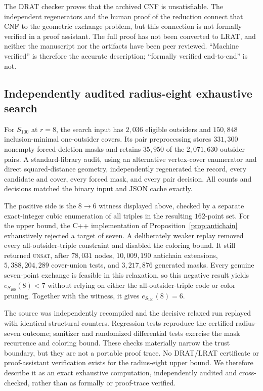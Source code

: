 \documentclass[11pt]{article}
\theoremstyle{definition}
\theoremstyle{remark}
\begin{document}
The DRAT checker proves that the archived CNF is unsatisfiable.  The independent
regenerators and the human proof of the reduction connect that CNF to the
geometric exchange problem, but this connection is not formally verified in a
proof assistant.  The full proof has not been converted to LRAT, and neither
the manuscript nor the artifacts have been peer reviewed.  ``Machine
verified'' is therefore the accurate description; ``formally verified
end-to-end'' is not.

\subsection{Independently audited radius-eight exhaustive search}

For $S_{100}$ at $r=8$, the search input has $2{,}036$ eligible outsiders and
$150{,}848$ inclusion-minimal one-outsider covers.  Its pair preprocessing
stores $331{,}300$ nonempty forced-deletion masks and retains $35{,}950$ of the
$2{,}071{,}630$ outsider pairs.  A standard-library audit, using an alternative
vertex-cover enumerator and direct squared-distance geometry, independently
regenerated the record, every candidate and cover, every forced mask, and
every pair decision.  All counts and decisions matched the binary input and
JSON cache exactly.

The positive side is the $8\to6$ witness displayed above, checked by a
separate exact-integer cubic enumeration of all triples in the resulting
$162$-point set.  For the upper bound, the C++ implementation of
Proposition~\ref{prop:antichain} exhaustively rejected a target of seven.  A
deliberately weaker replay removed every all-outsider-triple constraint and
disabled the coloring bound.  It still returned \textsc{unsat}, after
$78{,}031$ nodes, $10{,}009{,}190$ antichain extensions,
$5{,}388{,}204{,}289$ cover-union tests, and $3{,}217{,}876$ generated masks.
Every genuine seven-point exchange is feasible in this relaxation, so this
negative result yields $e_{S_{100}}(8)<7$ without relying on either the
all-outsider-triple code or color pruning.  Together with the witness, it gives
$e_{S_{100}}(8)=6$.

The source was independently recompiled and the decisive relaxed run replayed
with identical structural counters.  Regression tests reproduce the certified
radius-seven outcome; sanitizer and randomized differential tests exercise the
mask recurrence and coloring bound.  These checks materially narrow the trust
boundary, but they are not a portable proof trace.  No DRAT/LRAT certificate or
proof-assistant verification exists for the radius-eight upper bound.  We
therefore describe it as an exact exhaustive computation, independently
audited and cross-checked, rather than as formally or proof-trace verified.
\end{document}
